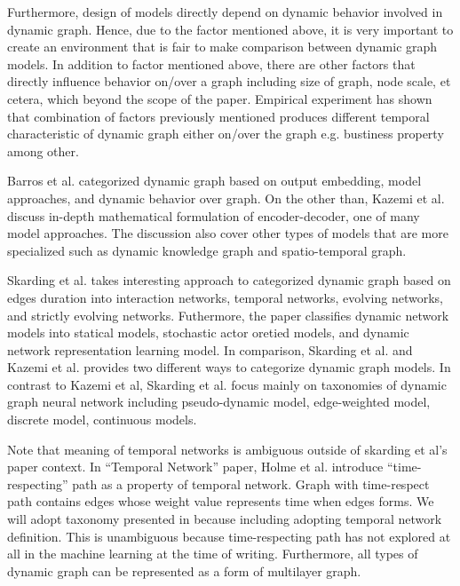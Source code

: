 \documentclass{IEEEtran}
\begin{document}
Furthermore, design of models directly depend on dynamic behavior involved in dynamic graph. Hence, due to the factor mentioned above, it is very important to create an environment that is fair to make comparison between dynamic graph models. In addition to factor mentioned above, there are other factors that directly influence behavior on/over a graph including size of graph, node scale, et cetera, which beyond the scope of the paper. Empirical experiment has shown that combination of factors previously mentioned produces different temporal characteristic of dynamic graph either on/over the graph e.g. bustiness property \cite{holme2012temporal} among other.

Barros et al. \cite{barrosSurveyEmbeddingDynamic2021} categorized dynamic graph based on output embedding, model approaches, and dynamic behavior over graph. On the other than, Kazemi et al. \cite{kazemiRepresentationLearningDynamica} discuss in-depth mathematical formulation of encoder-decoder, one of many model approaches. The discussion also cover other types of models that are more specialized such as dynamic knowledge graph and spatio-temporal graph.

Skarding et al. \cite{skardingFoundationsModelingDynamic2021} takes interesting approach to categorized dynamic graph based on edges duration into interaction networks, temporal networks, evolving networks, and strictly evolving networks. Futhermore, the paper classifies dynamic network models into statical models, stochastic actor oretied models, and dynamic network representation learning model. In comparison, Skarding et al. \cite{skardingFoundationsModelingDynamic2021} and Kazemi et al. \cite{kazemiRepresentationLearningDynamica} provides two different ways to categorize dynamic graph models. In contrast to Kazemi et al, Skarding et al. focus mainly on taxonomies of dynamic graph neural network including pseudo-dynamic model, edge-weighted model, discrete model, continuous models.

Note that meaning of temporal networks is ambiguous outside of skarding et al's paper \cite{skardingFoundationsModelingDynamic2021} context. In ``Temporal Network'' paper, Holme et al. \cite{holme2012temporal} introduce ``time-respecting'' path as a property of temporal network. Graph with time-respect path contains edges whose weight value represents time when edges forms. We will adopt taxonomy presented in \cite{skardingFoundationsModelingDynamic2021} because including adopting temporal network definition. This is unambiguous because time-respecting path has not explored at all in the machine learning at the time of writing. Furthermore, all types of dynamic graph can be represented as a form of multilayer graph. \cite{kivela2014multilayer}
\end{document}
